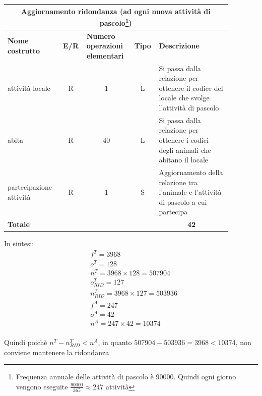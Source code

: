 \documentclass[12pt,a4paper]{article}
\begin{document}
\begin{center}\setlength{\extrarowheight}{1.5pt}\begin{longtable}{|p{0.2\linewidth}|p{0.1\linewidth}|p{0.175\linewidth}|p{0.1\linewidth}|p{0.3\linewidth}|}
\hline
\multicolumn{5}{|c|}{Aggiornamento ridondanza (ad ogni nuova attività di pascolo\footnote{Frequenza annuale delle attività di pascolo è 90000. Quindi ogni giorno vengono eseguite $\frac{90000}{365}\approx 247$ attività})}
\\
\hline \textbf{Nome costrutto}   & \multicolumn{1}{|c|}{\textbf{E/R}} & \textbf{Numero operazioni elementari} & \multicolumn{1}{|c|}{\textbf{Tipo}} & \textbf{Descrizione}\\ 

\hline
attività locale
 & 
\multicolumn{1}{|c|}{R}
 & 
\multicolumn{1}{|c|}{1}
 & 
\multicolumn{1}{|c|}{L}
 & 
Si passa dalla relazione per ottenere il codice del locale che svolge l'attività di pascolo
\\
\hline
abita
 & 
\multicolumn{1}{|c|}{R}
 & 
\multicolumn{1}{|c|}{40}
 & 
\multicolumn{1}{|c|}{L}
 & 
Si passa dalla relazione per ottenere i codici degli animali che abitano il locale
\\
\hline
partecipazione attività
 & 
\multicolumn{1}{|c|}{R}
 & 
\multicolumn{1}{|c|}{1}
 & 
\multicolumn{1}{|c|}{S}
 & 
Aggiornamento della relazione tra l'animale e l'attività di pascolo a cui partecipa
\\
\hline
\multicolumn{4}{|l|}{\textbf{Totale}}
 & 
\multicolumn{1}{|c|}{\textbf{42}}
\\
\hline
\end{longtable}\end{center}

In sintesi:
\begin{align*}
&f^T=3968
\\
&o^T = 128
\\
&n^T = 3968\times128= 507904
\\
&o^T_{RID}= 127
\\
&n^T_{RID} = 3968\times 127 = 503936
\\
&f^A= 247
\\
&o^A= 42
\\
&n^A = 247\times 42 = 10374
\\
\end{align*}


\vspace{7pt}Quindi poichè $n^T - n^T_{RID} < n^A$, in quanto $507904 - 503936 = 3968 < 10374$, non conviene mantenere la ridondanza
\end{document}

